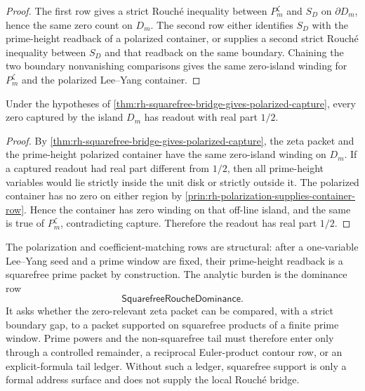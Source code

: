 \begin{proof}
The first row gives a strict Rouch\'e inequality between
$P_m^{\zeta}$ and $S_D$ on $\partial D_m$, hence the same zero count on
$D_m$.  The second row either identifies $S_D$ with the prime-height
readback of a polarized container, or supplies a second strict
Rouch\'e inequality between $S_D$ and that readback on the same
boundary.  Chaining the two boundary nonvanishing comparisons gives the
same zero-island winding for $P_m^{\zeta}$ and the polarized
Lee--Yang container.
\end{proof}

\begin{corollary}
\label{cor:rh-squarefree-bridge-fixed-half-readout}
Under the hypotheses of
\autoref{thm:rh-squarefree-bridge-gives-polarized-capture}, every zero
captured by the island $D_m$ has readout with real part $1/2$.
\end{corollary}

\begin{proof}
By \autoref{thm:rh-squarefree-bridge-gives-polarized-capture}, the
zeta packet and the prime-height polarized container have the same
zero-island winding on $D_m$.  If a captured readout had real part
different from $1/2$, then all prime-height variables would lie
strictly inside the unit disk or strictly outside it.  The polarized
container has no zero on either region by
\autoref{prin:rh-polarization-supplies-container-row}.  Hence the
container has zero winding on that off-line island, and the same is true
of $P_m^{\zeta}$, contradicting capture.  Therefore the readout has real
part $1/2$.
\end{proof}

\begin{principle}
\label{prin:rh-analytic-load-squarefree-bridge}
The polarization and coefficient-matching rows are structural: after a
one-variable Lee--Yang seed and a prime window are fixed, their
prime-height readback is a squarefree prime packet by construction.
The analytic burden is the dominance row
$$
\mathsf{SquarefreeRoucheDominance}.
$$
It asks whether the zero-relevant zeta packet can be compared, with a
strict boundary gap, to a packet supported on squarefree products of a
finite prime window.  Prime powers and the non-squarefree tail must
therefore enter only through a controlled remainder, a reciprocal
Euler-product contour row, or an explicit-formula tail ledger.  Without
such a ledger, squarefree support is only a formal address surface and
does not supply the local Rouch\'e bridge.
\end{principle}

